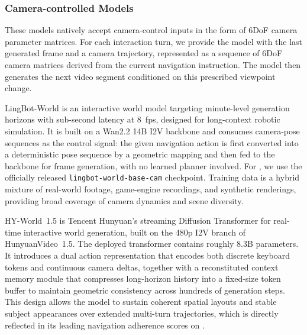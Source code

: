 \subsubsection{Camera-controlled Models}

These models natively accept camera-control inputs in the form of 6DoF camera parameter matrices.
For each interaction turn, we provide the model with the last generated frame and a camera trajectory, represented as a sequence of 6DoF camera matrices derived from the current navigation instruction.
The model then generates the next video segment conditioned on this prescribed viewpoint change.

LingBot-World is an interactive world model targeting minute-level generation horizons with sub-second latency at 8~fps, designed for long-context robotic simulation.
It is built on a Wan2.2 14B I2V backbone and consumes camera-pose sequences as the control signal: the given navigation action is first converted into a deterministic pose sequence by a geometric mapping and then fed to the backbone for frame generation, with no learned planner involved.
For \benchmark, we use the officially released \texttt{lingbot-world-base-cam} checkpoint.
Training data is a hybrid mixture of real-world footage, game-engine recordings, and synthetic renderings, providing broad coverage of camera dynamics and scene diversity.

HY-World~1.5 is Tencent Hunyuan's streaming Diffusion Transformer for real-time interactive world generation, built on the 480p I2V branch of HunyuanVideo~1.5.
The deployed transformer contains roughly $8.3$B parameters.
It introduces a dual action representation that encodes both discrete keyboard tokens and continuous camera deltas, together with a reconstituted context memory module that compresses long-horizon history into a fixed-size token buffer to maintain geometric consistency across hundreds of generation steps.
This design allows the model to sustain coherent spatial layouts and stable subject appearances over extended multi-turn trajectories, which is directly reflected in its leading navigation adherence scores on \benchmark.

